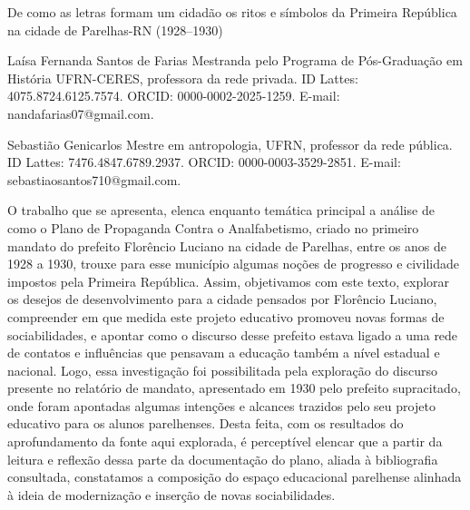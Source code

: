 \begin{refsection}
\renewcommand{\thefigure}{\arabic{figure}}

\chapterTwoLines
{De como as letras formam um cidadão}
{os ritos e símbolos da Primeira República na cidade de Parelhas-RN (1928--1930)}
\label{chap:decomoasletras}

\articleAuthor
{Laísa Fernanda Santos de Farias}
{Mestranda pelo Programa de Pós-Graduação em História UFRN-CERES, professora da rede privada. ID Lattes: 4075.8724.6125.7574. ORCID: 0000-0002-2025-1259. E-mail: nandafarias07@gmail.com.}

\articleAuthor
{Sebastião Genicarlos}
{Mestre em antropologia, UFRN, professor da rede pública. ID Lattes: 7476.4847.6789.2937. ORCID: 0000-0003-3529-2851. E-mail: sebastiaosantos710@gmail.com.}

\begin{galoResumo}
    O trabalho que se apresenta, elenca enquanto temática principal a análise de como o Plano de Propaganda Contra o Analfabetismo, criado no primeiro mandato do prefeito Florêncio Luciano na cidade de Parelhas, entre os anos de 1928 a 1930, trouxe para esse município algumas noções de progresso e civilidade impostos pela Primeira República. Assim, objetivamos com este texto, explorar os desejos de desenvolvimento para a cidade pensados por Florêncio Luciano, compreender em que medida este projeto educativo promoveu novas formas de sociabilidades, e apontar como o discurso desse prefeito estava ligado a uma rede de contatos e influências que pensavam a educação também a nível estadual e nacional.  Logo, essa investigação foi possibilitada pela exploração do discurso presente no relatório de mandato, apresentado em 1930 pelo prefeito supracitado, onde foram apontadas algumas intenções e alcances trazidos pelo seu projeto educativo para os alunos parelhenses. Desta feita, com os resultados do aprofundamento da fonte aqui explorada, é perceptível elencar que a partir da leitura e reflexão dessa parte da documentação do plano, aliada à bibliografia consultada, constatamos a composição do espaço educacional parelhense alinhada à ideia de modernização e inserção de novas sociabilidades. 
\end{galoResumo}


\end{refsection}
